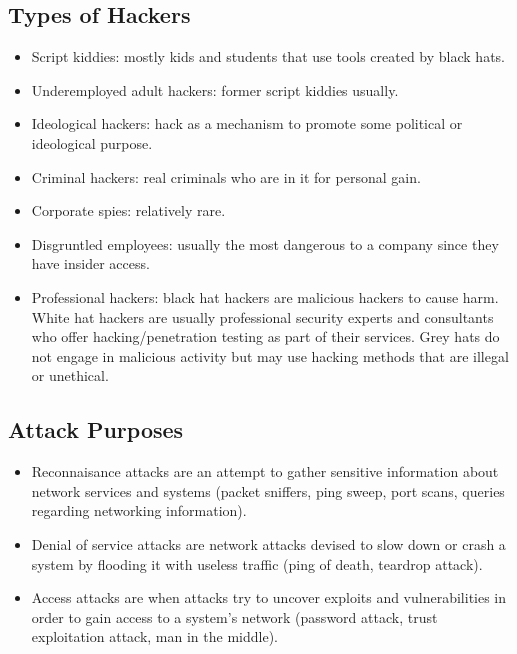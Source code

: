 \documentclass{math}
\begin{document}
\subsection*{Types of Hackers}
\begin{itemize}
  \item Script kiddies: mostly kids and students that use tools created by
    black hats.
  \item Underemployed adult hackers: former script kiddies usually.
  \item Ideological hackers: hack as a mechanism to promote some political
    or ideological purpose.
  \item Criminal hackers: real criminals who are in it for personal gain.
  \item Corporate spies: relatively rare.
  \item Disgruntled employees: usually the most dangerous to a company since
    they have insider access.
  \item Professional hackers: black hat hackers are malicious hackers to cause
    harm. White hat hackers are usually professional security experts and
    consultants who offer hacking/penetration testing as part of their services.
    Grey hats do not engage in malicious activity but may use hacking methods
    that are illegal or unethical.
\end{itemize}

\subsection*{Attack Purposes}
\begin{itemize}
  \item Reconnaisance attacks are an attempt to gather sensitive information
    about network services and systems (packet sniffers, ping sweep, port scans,
    queries regarding networking information).
  \item Denial of service attacks are network attacks devised to slow down or
    crash a system by flooding it with useless traffic (ping of death, teardrop
    attack).
  \item Access attacks are when attacks try to uncover exploits and
    vulnerabilities in order to gain access to a system's network (password
    attack, trust exploitation attack, man in the middle).
\end{itemize}
\end{document}
